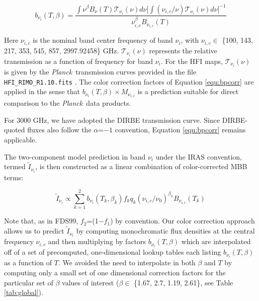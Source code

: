 \documentclass{emulateapj}
\newcommand{\PLANCK}{{\it Planck}}
\begin{document}

\begin{equation} \label{equ:bpcorr}
b_{\nu_i}(T, \beta) = \frac{\int \nu^{\beta}B_{\nu}(T)\mathcal{T}_{\nu_i}(\nu) d\nu \bigg[\int (\nu_{i,c}/\nu)\mathcal{T}_{\nu_i}(\nu) d\nu\bigg]^{-1}}{\nu_{i,c}^{\beta}B_{\nu_{i,c}}(T)}
\end{equation}


Here $\nu_{i,c}$ is the nominal band center frequency of band $\nu_i$,  with 
$\nu_{i,c} \in$ \{100, 143, 217, 353, 545, 857, 2997.92458\} GHz. 
$\mathcal{T}_{\nu_i}(\nu)$ represents the relative transmission as a function 
of frequency for band $\nu_i$. For the HFI maps, $\mathcal{T}_{\nu_i}(\nu)$ is 
given by the \PLANCK~transmission curves provided in the file 
\verb|HFI_RIMO_R1.10.fits| \citep{planckresponse}. The color correction factors
of Equation \ref{equ:bpcorr} are applied in the sense that 
$b_{\nu_i}(T ,\beta)\times M_{\nu_{i,c}}$ is a prediction suitable for 
direct comparison to the \PLANCK~data products.

For 3000 GHz, we have adopted the DIRBE transmission curve. Since DIRBE-quoted
fluxes also follow the $\alpha$=$-1$ convention, Equation \ref{equ:bpcorr}
remains applicable.

The two-component model prediction in band $\nu_i$ under the IRAS convention, 
termed $\tilde{I}_{\nu_i}$, is then constructed as a linear combination of 
color-corrected MBB terms:

\begin{equation} \label{equ:iras}
\tilde{I}_{\nu_i} \propto \sum_{k=1}^{2} b_{\nu_i}(T_k, \beta_k) f_k q_k (\nu_{i,c}/\nu_0)^{\beta_k} B_{\nu_{i,c}}(T_k)
\end{equation}

Note that, as in FDS99, $f_2$=(1$-$$f_1$) by convention. Our color correction 
approach allows us to predict $\tilde{I}_{\nu_i}$ by computing monochromatic 
flux densities at the central frequency $\nu_{i,c}$ and then multiplying by 
factors $b_{\nu_i}(T, \beta)$ which are interpolated off of a set of 
precomputed, one-dimensional lookup tables each listing $b_{\nu_i}(T, \beta)$ 
as a function of $T$. We avoided the need to interpolate in both $\beta$ and 
$T$ by computing only a small set of one dimensional correction factors for the
particular set of $\beta$ values of interest 
($\beta \in$ \{1.67, 2.7, 1.19, 2.61\}, see Table \ref{tab:global}).
\end{document}
